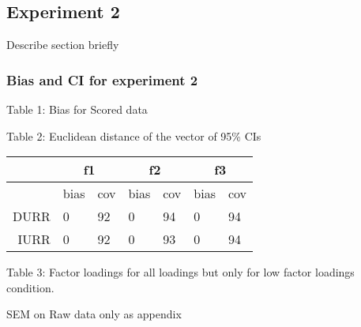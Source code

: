 \maketitle
\subsection{Experiment 2}
Describe section briefly 

\subsubsection{Bias and CI for experiment 2}

Table 1: Bias for Scored data

Table 2: Euclidean distance of the vector of 95\% CIs
\begin{table}[ht]
\centering
\begin{tabular}{rllllll}
  \hline
  & \multicolumn{2}{c}{f1}& \multicolumn{2}{c}{f2}& \multicolumn{2}{c}{f3}\\ \hline
  & bias & cov & bias & cov & bias & cov \\ 
  DURR & 0 & 92 & 0 & 94 & 0 & 94 \\ 
  IURR & 0 & 92 & 0 & 93 & 0 & 94 \\ 
   \hline
\end{tabular}
\end{table}

Table 3: Factor loadings for all loadings but only for low factor loadings condition.

SEM on Raw data only as appendix

